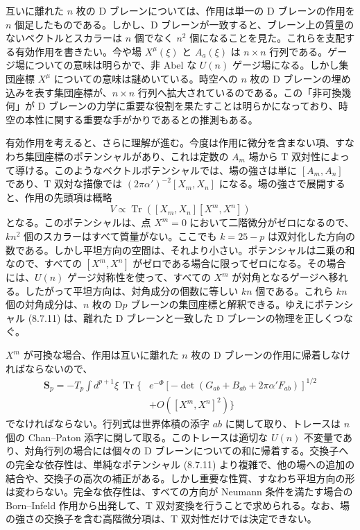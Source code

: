 互いに離れた $n$ 枚の D ブレーンについては、作用は単一の D ブレーンの作用を $n$ 個足したものである。しかし、D ブレーンが一致すると、ブレーン上の質量のないベクトルとスカラーは $n$ 個でなく $n^2$ 個になることを見た。これらを支配する有効作用を書きたい。今や場 $X^\mu(\xi)$ と $A_a(\xi)$ は $n\times n$ 行列である。ゲージ場についての意味は明らかで、非 Abel な $U(n)$ ゲージ場になる。しかし集団座標 $X^\mu$ についての意味は謎めいている。時空への $n$ 枚の D ブレーンの埋め込みを表す集団座標が、$n\times n$ 行列へ拡大されているのである。この「非可換幾何」が D ブレーンの力学に重要な役割を果たすことは明らかになっており、時空の本性に関する重要な手がかりであるとの推測もある。

有効作用を考えると、さらに理解が進む。今度は作用に微分を含まない項、すなわち集団座標のポテンシャルがあり、これは定数の $A_m$ 場から T 双対性によって導ける。このようなベクトルポテンシャルでは、場の強さは単に $[A_m,A_n]$ であり、T 双対な描像では $(2\pi\alpha')^{-2}[X_m,X_n]$ になる。場の強さで展開すると、作用の先頭項は概略
\begin{equation}
V\propto\operatorname{Tr}\left([X_m,X_n][X^m,X^n]\right)
\tag{8.7.11}\label{eq:8.7.11}
\end{equation}
となる。このポテンシャルは、点 $X^m=0$ において二階微分がゼロになるので、$kn^2$ 個のスカラーはすべて質量がない。ここでも $k=25-p$ は双対化した方向の数である。しかし平坦方向の空間は、それより小さい。ポテンシャルは二乗の和なので、すべての $[X^m,X^n]$ がゼロである場合に限ってゼロになる。その場合には、$U(n)$ ゲージ対称性を使って、すべての $X^m$ が対角となるゲージへ移れる。したがって平坦方向は、対角成分の個数に等しい $kn$ 個である。これら $kn$ 個の対角成分は、$n$ 枚の D$p$ ブレーンの集団座標と解釈できる。ゆえにポテンシャル (8.7.11) は、離れた D ブレーンと一致した D ブレーンの物理を正しくつなぐ。

$X^m$ が可換な場合、作用は互いに離れた $n$ 枚の D ブレーンの作用に帰着しなければならないので、
\begin{equation}
\begin{split}
\boldsymbol S_p=-T_p\int d^{p+1}\xi\,
\operatorname{Tr}\bigl\{&
e^{-\Phi}[-\det(G_{ab}+B_{ab}+2\pi\alpha'F_{ab})]^{1/2}\\
&+O([X^m,X^n]^2)\bigr\}
\end{split}
\tag{8.7.12}\label{eq:8.7.12}
\end{equation}
でなければならない。行列式は世界体積の添字 $ab$ に関して取り、トレースは $n$ 個の Chan--Paton 添字に関して取る。このトレースは適切な $U(n)$ 不変量であり、対角行列の場合には個々の D ブレーンについての和に帰着する。交換子への完全な依存性は、単純なポテンシャル (8.7.11) より複雑で、他の場への追加の結合や、交換子の高次の補正がある。しかし重要な性質、すなわち平坦方向の形は変わらない。完全な依存性は、すべての方向が Neumann 条件を満たす場合の Born--Infeld 作用から出発して、T 双対変換を行うことで求められる。なお、場の強さの交換子を含む高階微分項は、T 双対性だけでは決定できない。

